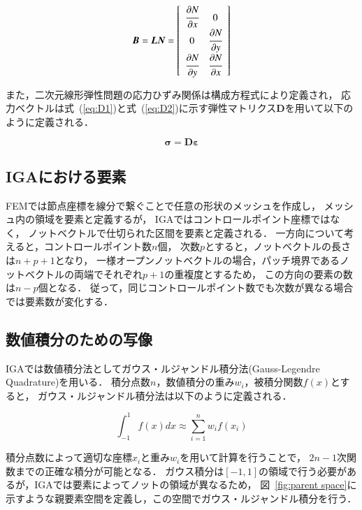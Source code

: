 \begin{equation}
  \boldsymbol{B} = \boldsymbol{L}\boldsymbol{N} = \left[
    \begin{array}{cc}
       \cfrac{\partial N}{\partial x} & 0 \\
      0 & \cfrac{\partial N}{\partial y} \\
      \cfrac{\partial N}{\partial y} & \cfrac{\partial N}{\partial x} 
    \end{array}
  \right]
\end{equation}

\noindent
また，二次元線形弾性問題の応力ひずみ関係は構成方程式により定義され，
応力ベクトルは式~(\ref{eq:D1})と式~(\ref{eq:D2})に示す弾性マトリクス$\boldsymbol{D}$を用いて以下のように定義される．

\begin{equation}
  \boldsymbol{\sigma}=\boldsymbol{D}\boldsymbol{\varepsilon}
\end{equation}

\subsection{IGAにおける要素}
FEMでは節点座標を線分で繋ぐことで任意の形状のメッシュを作成し，
メッシュ内の領域を要素と定義するが，
IGAではコントロールポイント座標ではなく，
ノットベクトルで仕切られた区間を要素と定義される．
一方向について考えると，コントロールポイント数$n$個，
次数$p$とすると，ノットベクトルの長さは$n+p+1$となり，
一様オープンノットベクトルの場合，パッチ境界であるノットベクトルの両端でそれぞれ$p+1$の重複度とするため，
この方向の要素の数は$n-p$個となる．
従って，同じコントロールポイント数でも次数が異なる場合では要素数が変化する．

\newpage

\subsection{数値積分のための写像}
IGAでは数値積分法としてガウス・ルジャンドル積分法(Gauss-Legendre Quadrature)を用いる．
積分点数$n$，数値積分の重み$w_i$，被積分関数$f(x)$とすると，
ガウス・ルジャンドル積分法は以下のように定義される．

\begin{equation}
  \int^1_{-1} f(x)dx \approx \sum^n_{i=1}w_if(x_i)
\end{equation}

\noindent
積分点数によって適切な座標$x_i$と重み$w_i$を用いて計算を行うことで，
$2n-1$次関数までの正確な積分が可能となる．
ガウス積分は$[-1,1]$の領域で行う必要があるが，IGAでは要素によってノットの領域が異なるため，
図~\ref{fig:parent space}に示すような親要素空間を定義し，この空間でガウス・ルジャンドル積分を行う．

